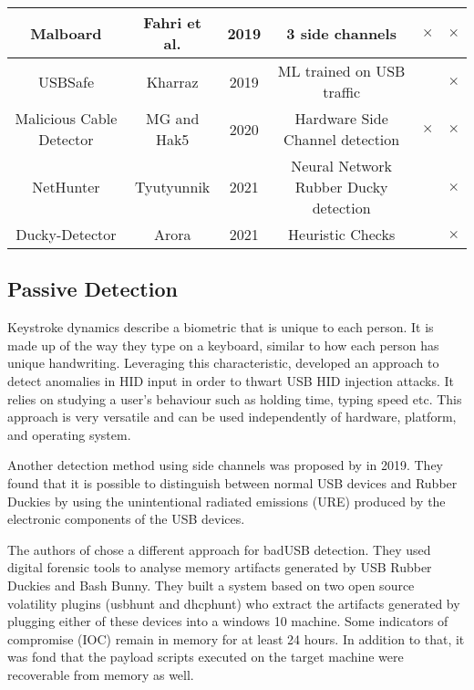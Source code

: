 {\begin{tabular}{|c c c c c c|}
 Malboard & Fahri et al. \cite{farhiMalboardNovelUser2019} & 2019 & 3 side channels & $\times$ & $\times$\\
 \hline
 USBSafe & Kharraz \cite{kharrazUSBESAFEEndPointSolution2019} & 2019 & ML trained on USB traffic & & $\times$\\
 \hline
 Malicious Cable Detector & MG and Hak5 \cite{hak5MaliciousCableDetector} & 2020 & Hardware Side Channel detection & $\times$ & $\times$ \\
 \hline
 NetHunter & Tyutyunnik \cite{IntelligentSystemPreventing} & 2021 & Neural Network Rubber Ducky detection & & $\times$\\
 \hline
 Ducky-Detector & Arora \cite{USBRubberDucky2021} & 2021 & Heuristic Checks & & $\times$\\
 \hline
\end{tabular}
}%

\subsection{Passive Detection}


Keystroke dynamics describe a biometric that is unique to each person. It is made up of the way they type on a keyboard, similar to how each person has unique handwriting. Leveraging this characteristic, \cite{barbhuiyaAnomalyBasedApproach2012} developed an approach to detect anomalies in HID input in order to thwart USB HID injection attacks. It relies on studying a user's behaviour such as holding time, typing speed etc. This approach is very versatile and can be used independently of hardware, platform, and operating system.  

Another detection method using side channels was proposed by \cite{ibrahimRFDNAFingerprintingDetection2019} in 2019. They found that it is possible to distinguish between normal USB devices and Rubber Duckies by using the unintentional radiated emissions (URE) produced by the electronic components of the USB devices. 

The authors of \cite{thomasDuckHuntMemory2021} chose a different approach for badUSB detection. They used digital forensic tools to analyse memory artifacts generated by USB Rubber Duckies and Bash Bunny. They built a system based on two open source volatility plugins (usbhunt and dhcphunt) who extract the artifacts generated by plugging either of these devices into a windows 10 machine. Some indicators of compromise (IOC) remain in memory for at least 24 hours. In addition to that, it was fond that the payload scripts executed on the target machine were recoverable from memory as well. 

